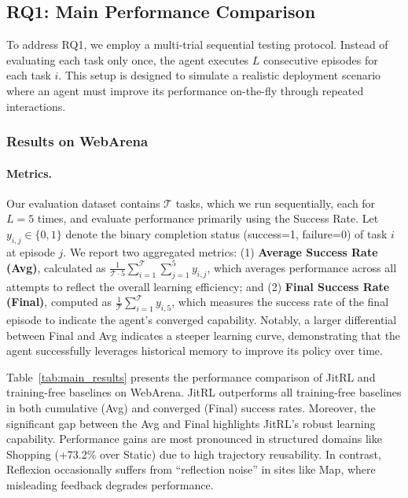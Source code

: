 \subsection{RQ1: Main Performance Comparison}
To address RQ1, we employ a multi-trial sequential testing protocol. Instead of evaluating each task only once, the agent executes $L$ consecutive episodes for each task $i$. This setup is designed to simulate a realistic deployment scenario where an agent must improve its performance on-the-fly through repeated interactions. 



\subsubsection{Results on WebArena}

\paragraph{Metrics.} Our evaluation dataset contains $\mathcal{T}$ tasks, which we run sequentially, each for $L=5$ times, and evaluate performance primarily using the Success Rate. Let $y_{i,j} \in \{0,1\}$ denote the binary completion status (success=1, failure=0) of task $i$ at episode $j$. We report two aggregated metrics: (1) \textbf{Average Success Rate (Avg)}, calculated as $\frac{1}{\mathcal{T}\cdot 5}\sum_{i=1}^{\mathcal{T}}\sum_{j=1}^{5}y_{i,j}$, which averages performance across all attempts to reflect the overall learning efficiency; and (2) \textbf{Final Success Rate (Final)}, computed as $\frac{1}{\mathcal{T}}\sum_{i=1}^{\mathcal{T}}y_{i,5}$, which measures the success rate of the final episode to indicate the agent's converged capability.  Notably, a larger differential between Final and Avg indicates a steeper learning curve, demonstrating that the agent successfully leverages historical memory to improve its policy over time.


Table~\ref{tab:main_results} presents the performance comparison of JitRL and training-free baselines on WebArena. JitRL outperforms all training-free baselines in both cumulative (Avg) and converged (Final) success rates. Moreover, the significant gap between the Avg and Final highlights JitRL's robust learning capability. Performance gains are most pronounced in structured domains like Shopping (+73.2\% over Static) due to high trajectory reusability. In contrast, Reflexion occasionally suffers from ``reflection noise'' in sites like Map, where misleading feedback degrades performance.



